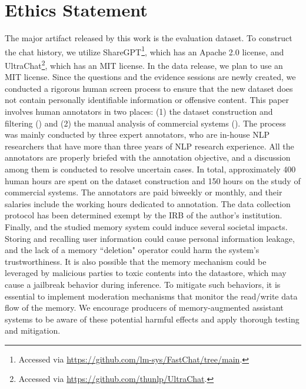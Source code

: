 \section*{{Ethics Statement}}

The major artifact released by this work is the \BENCHMARK{} evaluation dataset. To construct the chat history, we utilize ShareGPT\footnote{Accessed via \url{https://github.com/lm-sys/FastChat/tree/main}.}, which has an Apache 2.0 license, and UltraChat\footnote{Accessed via \url{https://github.com/thunlp/UltraChat}.}, which has an MIT license. In the data release, we plan to use an MIT license. Since the questions and the evidence sessions are newly created, we conducted a rigorous human screen process to ensure that the new dataset does not contain personally identifiable information or offensive content. This paper involves human annotators in two places: (1) the dataset construction and filtering () and (2) the manual analysis of commercial systems (). The process was mainly conducted by three expert annotators, who are in-house NLP researchers that have more than three years of NLP research experience. All the annotators are properly briefed with the annotation objective, and a discussion among them is conducted to resolve uncertain cases. In total, approximately 400 human hours are spent on the dataset construction and 150 hours on the study of commercial systems. The annotators are paid biweekly or monthly, and their salaries include the working hours dedicated to annotation. The data collection protocol has been determined exempt by the IRB of the author's institution. Finally, \BENCHMARK{} and the studied memory system could induce several societal impacts. Storing and recalling user information could cause personal information leakage, and the lack of a memory ``deletion" operator could harm the system's trustworthiness. It is also possible that the memory mechanism could be leveraged by malicious parties to toxic contents into the datastore, which may cause a jailbreak behavior during inference. To mitigate such behaviors, it is essential to implement moderation mechanisms that monitor the read/write data flow of the memory. We encourage producers of memory-augmented assistant systems to be aware of these potential harmful effects and apply thorough testing and mitigation.

